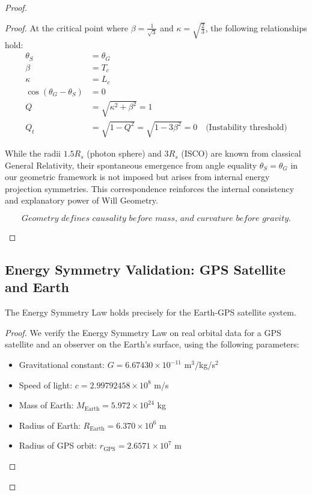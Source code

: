 \documentclass{article}
\begin{document}
\begin{proof}
\begin{proof}
At the critical point where \(\beta = \frac{1}{\sqrt{3}}\) and \(\kappa = \sqrt{\frac{2}{3}}\), the following relationships hold:
\begin{align}
\theta_S &= \theta_G \\
\beta &= T_c \\
\kappa &= L_c \\
\cos(\theta_{G}-\theta_{S}) &= 0 \\
 Q &=\sqrt{\kappa^2 + \beta^2}=1 \\
Q_t &= \sqrt{1-Q^2} =\sqrt{1-3\beta^2} = 0 \quad \text{(Instability threshold)}
\end{align}

\begin{tcolorbox}[colback=gray!5,colframe=black!40!black,title=Interpretive Note]
While the radii \(1.5R_s\) (photon sphere) and \(3R_s\) (ISCO) are known from classical General Relativity, their spontaneous emergence from angle equality \(\theta_S = \theta_G\) in our geometric framework is not imposed but arises from internal energy projection symmetries. This correspondence reinforces the internal consistency and explanatory power of Will Geometry.
\end{tcolorbox}

\begin{tcolorbox}[colback=gray!5, colframe=black!80!black, title=Projectional Principle]
\[
\textit{Geometry defines causality before mass, and curvature before gravity.}
\]
\end{tcolorbox}
\end{proof}

\subsection{Energy Symmetry Validation: GPS Satellite and Earth}

\begin{theorem}
The Energy Symmetry Law holds precisely for the Earth-GPS satellite system.
\end{theorem}

\begin{proof}
We verify the Energy Symmetry Law on real orbital data for a GPS satellite and an observer on the Earth's surface, using the following parameters:
\begin{itemize}
\item Gravitational constant: $G = 6.67430 \times 10^{-11}$ m$^3$/kg/s$^2$
\item Speed of light: $c = 2.99792458 \times 10^8$ m/s
\item Mass of Earth: $M_{\text{Earth}} = 5.972 \times 10^{24}$ kg
\item Radius of Earth: $R_{\text{Earth}} = 6.370 \times 10^6$ m
\item Radius of GPS orbit: $r_{\text{GPS}} = 2.6571 \times 10^7$ m
\end{itemize}


\end{proof}
\end{proof}
\end{document}
